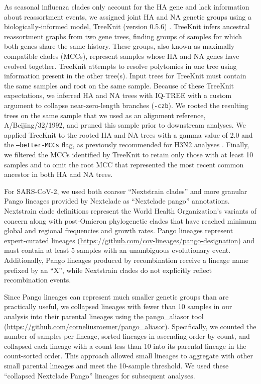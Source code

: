 \documentclass[webpdf,contemporary,large,single]{oup-authoring-template}%
\theoremstyle{thmstyleone}%
\theoremstyle{thmstyletwo}%
\theoremstyle{thmstylethree}%
\begin{document}
As seasonal influenza clades only account for the HA gene and lack information about reassortment events, we assigned joint HA and NA genetic groups using a biologically-informed model, TreeKnit (version 0.5.6) \citep{Barrat-Charlaix2022}.
TreeKnit infers ancestral reassortment graphs from two gene trees, finding groups of samples for which both genes share the same history.
These groups, also known as maximally compatible clades (MCCs), represent samples whose HA and NA genes have evolved together.
TreeKnit attempts to resolve polytomies in one tree using information present in the other tree(s).
Input trees for TreeKnit must contain the same samples and root on the same sample.
Because of these TreeKnit expectations, we inferred HA and NA trees with IQ-TREE with a custom argument to collapse near-zero-length branches (\texttt{-czb}).
We rooted the resulting trees on the same sample that we used as an alignment reference, A/Beijing/32/1992, and pruned this sample prior to downstream analyses.
We applied TreeKnit to the rooted HA and NA trees with a gamma value of 2.0 and the \texttt{--better-MCCs} flag, as previously recommended for H3N2 analyses \citep{Barrat-Charlaix2022}.
Finally, we filtered the MCCs identified by TreeKnit to retain only those with at least 10 samples and to omit the root MCC that represented the most recent common ancestor in both HA and NA trees.

For SARS-CoV-2, we used both coarser ``Nextstrain clades'' \citep{Hodcroft2020,Bedford2021,Roemer2022} and more granular Pango lineages \citep{OToole2021} provided by Nextclade as ``Nextclade pango'' annotations.
Nextstrain clade definitions represent the World Health Organization's variants of concern along with post-Omicron phylogenetic clades that have reached minimum global and regional frequencies and growth rates.
Pango lineages represent expert-curated lineages (\href{https://github.com/cov-lineages/pango-designation}{https://github.com/cov-lineages/pango-designation}) and must contain at least 5 samples with an unambiguous evolutionary event.
Additionally, Pango lineages produced by recombination receive a lineage name prefixed by an ``X'', while Nextstrain clades do not explicitly reflect recombination events.

Since Pango lineages can represent much smaller genetic groups than are practically useful, we collapsed lineages with fewer than 10 samples in our analysis into their parental lineages using the pango\_aliasor tool (\href{https://github.com/corneliusroemer/pango_aliasor}{https://github.com/corneliusroemer/pango\_aliasor}).
Specifically, we counted the number of samples per lineage, sorted lineages in ascending order by count, and collapsed each lineage with a count less than 10 into its parental lineage in the count-sorted order.
This approach allowed small lineages to aggregate with other small parental lineages and meet the 10-sample threshold.
We used these ``collapsed Nextclade Pango'' lineages for subsequent analyses.
\end{document}
